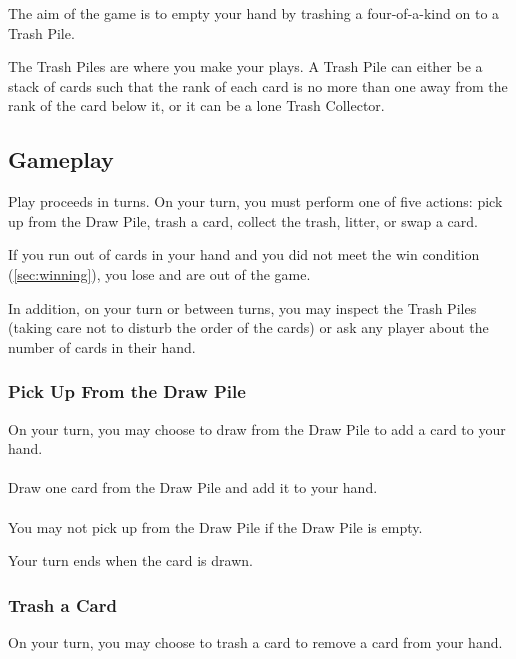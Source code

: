 \documentclass{article}
\begin{document}
The aim of the game is to empty your hand by trashing a four-of-a-kind on to a Trash Pile.

The Trash Piles are where you make your plays. A Trash Pile can either be a stack of cards such that the rank of each card is no more than one away from the rank of the card below it, or it can be a lone Trash Collector.

\subsection{Gameplay \label{sec:gameplay}}

Play proceeds in turns. On your turn, you must perform one of five actions: pick up from the Draw Pile, trash a card, collect the trash, litter, or swap a card.

If you run out of cards in your hand and you did not meet the win condition (\autoref{sec:winning}), you lose and are out of the game.

In addition, on your turn or between turns, you may inspect the Trash Piles (taking care not to disturb the order of the cards) or ask any player about the number of cards in their hand.

\newpage
\subsubsection{Pick Up From the Draw Pile \label{sec:draw}}

On your turn, you may choose to draw from the Draw Pile to add a card to your hand.

\paragraph{\label{par:drawnormal}}
Draw one card from the Draw Pile and add it to your hand.

\paragraph{\label{par:drawempty}}
You may not pick up from the Draw Pile if the Draw Pile is empty.

Your turn ends when the card is drawn.

\subsubsection{Trash a Card \label{sec:trashcard}}

On your turn, you may choose to trash a card to remove a card from your hand.
\end{document}
